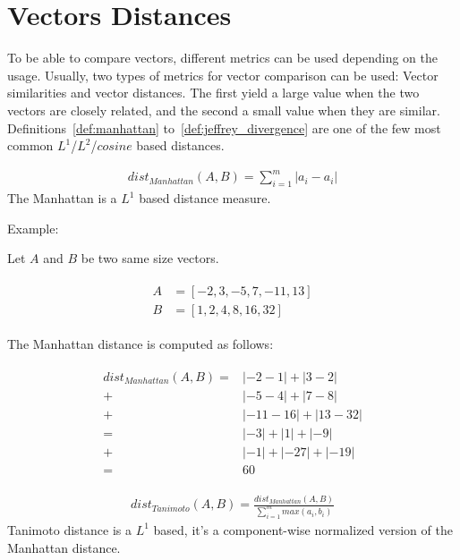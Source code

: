 \section{Vectors Distances \label{sec:vectors_distances}}

To be able to compare vectors, different metrics can be used depending on the usage.
Usually, two types of metrics for vector comparison can be used: Vector similarities and vector distances.
The first yield a large value when the two vectors are closely related, and the second a small value when they are similar.
Definitions~\ref{def:manhattan} to~\ref{def:jeffrey_divergence} are one of the few most common $L^1$/$L^2$/$cosine$ based distances.

\begin{definition}
  \begin{gather*}
    dist_{Manhattan}(A, B) = \sum_{i=1}^{m} |a_i - a_i|
  \end{gather*}
  The Manhattan is a $L^1$ based distance measure.

  Example:

  Let $A$ and $B$ be two same size vectors.

  \begin{gather*}
    \begin{aligned}
      A &= \left[-2, 3, -5, 7, -11, 13 \right] \\
      B &= \left[1, 2, 4, 8, 16, 32 \right]
    \end{aligned}
  \end{gather*}

  The Manhattan distance is computed as follows:

  \begin{gather*}
    \begin{aligned}
      dist_{Manhattan}(A, B) =& |-2 - 1| + |3 - 2| \\
                             +& |-5 - 4| + |7 - 8| \\
                             +& |-11 - 16| + |13 - 32| \\
                             =& |-3| + |1| + |-9| \\
                             +& |-1| + |-27| + |-19| \\
                             =& 60
    \end{aligned}
  \end{gather*}
\end{definition}

\begin{definition}
  \begin{gather*}
    dist_{Tanimoto}(A, B) = \frac{dist_{Manhattan}(A, B)}{\sum_{i=1}^{m} max(a_i, b_i)}
  \end{gather*}
  Tanimoto distance is a $L^1$ based, it's a component-wise normalized version of the Manhattan distance.
\end{definition}

